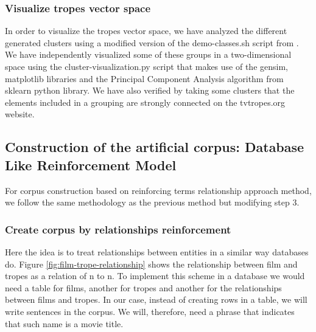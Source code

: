 \documentclass[letterpaper]{article}
\begin{document}
\subsubsection{Visualize tropes vector space}
In order to visualize the tropes vector space, we have analyzed the different generated clusters using a modified version of the demo-classes.sh script from \cite{git-hub-word2vec}. 
We have independently visualized some of these groups in a two-dimensional space using the cluster-visualization.py script that makes use of the gensim, matplotlib libraries and the Principal Component Analysis algorithm from sklearn python library. We have also verified by taking some clusters that the elements included in a grouping are strongly connected on the tvtropes.org website.

\subsection{Construction of the artificial corpus: Database Like Reinforcement Model}
For corpus construction based on reinforcing terms relationship approach method, we follow the same methodology as the previous method but modifying step 3.
	
	
	
   \subsubsection{Create corpus by relationships reinforcement}

Here the idea is to treat relationships between entities in a similar way databases do. Figure \ref{fig:film-trope-relationship} shows the relationship between film and tropes as a relation of n to n. To implement this scheme in a database we would need a table for films, another for tropes and another for the relationships between films and tropes. In our case, instead of creating rows in a table, we will write sentences in the corpus. We will, therefore, need a phrase that indicates that such
name is a movie title.
\end{document}
